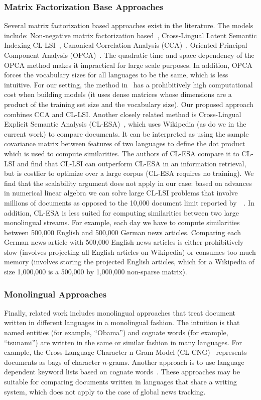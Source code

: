 \documentclass[twoside,11pt]{article}
\begin{document}
\subsubsection{Matrix Factorization Base Approaches} Several matrix factorization based approaches exist in the literature. The models include: Non-negative matrix factorization based~\cite{nonnegfactor_lsi}, Cross-Lingual Latent Semantic Indexing CL-LSI~, Canonical Correlation Analysis (CCA)~\cite{Hotelling}, Oriented Principal Component Analysis (OPCA)~\cite{platt2010translingual}. The quadratic time and space dependency of the OPCA method makes it impractical for large scale purposes. In addition, OPCA forces the vocabulary sizes for all languages to be the same, which is less intuitive. For our setting, the method in~\cite{nonnegfactor_lsi} has a prohibitively high computational cost when building models (it uses dense matrices whose dimensions are a product of the training set size and the vocabulary size). Our proposed approach combines CCA and CL-LSI. Another closely related method is Cross-Lingual Explicit Semantic Analysis (CL-ESA)~\cite{ESA}, which uses Wikipedia (as do we in the current work) to compare documents. It can be interpreted as using the sample covariance matrix between features of two languages to define the dot product which is used to compute similarities.
The authors of CL-ESA compare it to CL-LSI and find that CL-LSI can outperform CL-ESA in an information retrieval, but is costlier to optimize over a large corpus (CL-ESA requires no training). We find that the scalability argument does not apply in our case: based on advances in numerical linear algebra we can solve large CL-LSI problems that involve millions of documents as opposed to the 10,000 document limit reported by~\citeauthor{ESA}~\citeyear{ESA}. In addition, CL-ESA is less suited for computing similarities between two large monolingual streams. For example, each day we have to compute similarities between 500,000 English and 500,000 German news articles. Comparing each German news article with 500,000 English news articles is either prohibitively slow (involves projecting all English articles on Wikipedia) or consumes too much memory (involves storing the projected English articles, which for a Wikipedia of size 1,000,000 is a 500,000 by 1,000,000 non-sparse matrix).

\subsubsection{Monolingual Approaches} Finally, related work includes monolingual approaches that treat document written in different languages in a monolingual fashion. The intuition is that named entities (for example, ``Obama'') and cognate words (for example, ``tsunami'') are written in the same or similar fashion in many languages. For example, the Cross-Language Character n-Gram Model (CL-CNG)~\cite{plagiarism} represents documents as bags of character $n$-grams. Another approach is to use language dependent keyword lists based on cognate words~\cite{pouliquen2008story}. These approaches may be suitable for comparing documents written in languages that share a writing system, which does not apply to the case of global news tracking.
\end{document}
